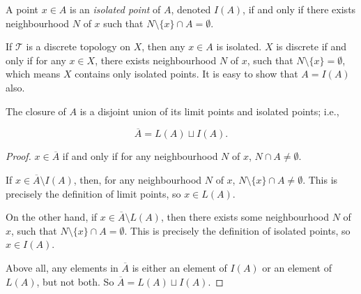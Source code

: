 \begin{definition}
	A point $x \in A$ is an \textit{isolated point} of $A$, denoted $I(A)$, if and only if there exists neighbourhood $N$ of $x$ such that $N \setminus \{x\} \cap A = \emptyset$.
\end{definition}


\begin{example}
	If $\mathcal T$ is a discrete topology on $X$, then any $x \in A$ is isolated. $X$ is discrete if and only if for any $x \in X$, there exists neighbourhood $N$ of $x$, such that $N \setminus \{x\} = \emptyset$, which means $X$ contains only isolated points. It is easy to show that $A = I(A)$ also.
\end{example}


\begin{proposition}
	The closure of $A$ is a disjoint union of its limit points and isolated points; i.e.,

	$$
	\overline A = L(A) \sqcup I(A).
	$$
	
	\begin{proof}
		$x \in \overline A$ if and only if for any neighbourhood $N$ of $x$, $N \cap A \ne \emptyset$.
		
		
		If $x \in \overline A \setminus I(A)$, then, for any neighbourhood $N$ of $x$, $N \setminus \{x\} \cap A \ne \emptyset$. This is precisely the definition of limit points, so $x \in L(A)$.
		
		On the other hand, if $x \in \overline A \setminus L(A)$, then there exists some neighbourhood $N$ of $x$, such that $N \setminus \{x\} \cap A = \emptyset$. This is precisely the definition of isolated points, so $x \in I(A)$.
		
		Above all, any elements in $\overline A$ is either an element of $I(A)$ or an element of $L(A)$, but not both. So $\overline A = L(A) \sqcup I(A)$.
	\end{proof}
\end{proposition}



